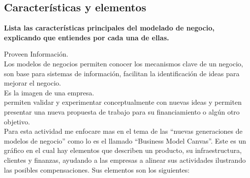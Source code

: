\documentclass[spanish,12pt,letterpapper]{article}
\begin{document}
	\subsection{Características y elementos}
	
	\textbf{Lista las características principales del modelado de negocio, explicando que entiendes por cada una de ellas.\\}
	
	Proveen Información. \\
	Los modelos de negocios permiten conocer los mecanismos clave de un negocio, son base para sistemas de información, facilitan la identificación de ideas para mejorar el negocio.\\
	 
	Es la imagen de una empresa.\\
	permiten validar y experimentar conceptualmente con nuevas ideas y permiten presentar una nueva propuesta de trabajo para su financiamiento o algún otro objetivo.\\
	
	Para esta actividad me enfocare mas en el tema de las ``nuevas generaciones de modelos de negocio'' como lo es el llamado ``Business Model Canvas''. Este es un gráfico en el cual hay elementos que describen un producto, su infraestructura, clientes y finanzas, ayudando a las empresas a alinear sus actividades ilustrando las posibles compensaciones. Sus elementos son los siguientes: \\
	
\end{document}
